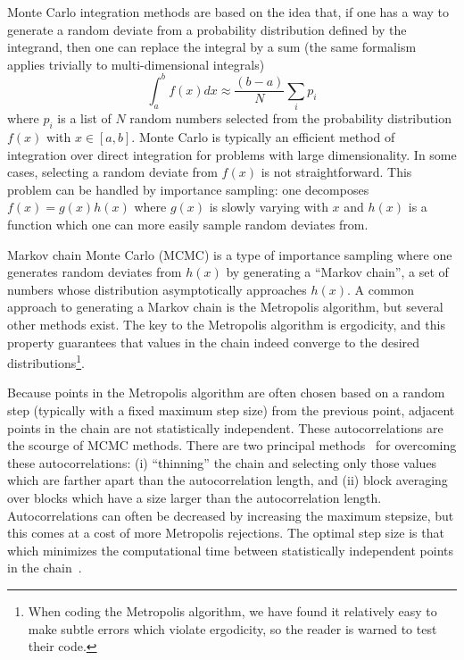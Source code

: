 Monte Carlo integration methods are based on the idea that, if one
has a way to generate a random deviate from a probability distribution
defined by the integrand, then one can replace the integral by a sum
(the same formalism applies trivially to multi-dimensional integrals)
\begin{equation}
  \int_a^{b} f(x) dx \approx \frac{\left( b-a\right)}{N} \sum_i p_i 
\end{equation}
where $p_i$ is a list of $N$ random numbers selected from the
probability distribution $f(x)$ with $x \in [a,b]$. Monte
Carlo is typically an efficient method of integration
over direct integration for
problems with large dimensionality. In some cases,
selecting a random deviate from $f(x)$ is not straightforward.
This problem can be handled by importance sampling: one decomposes
$f(x)=g(x)h(x)$ where $g(x)$ is slowly varying with $x$ and $h(x)$
is a function which one can more easily sample random deviates from.

Markov chain Monte Carlo (MCMC) is a type of
importance sampling where one generates random deviates from $h(x)$
by generating a ``Markov chain'', a set of numbers whose distribution
asymptotically approaches $h(x)$. A common approach to generating
a Markov chain is the Metropolis algorithm, but several other methods
exist. The key to the Metropolis algorithm is ergodicity, and this
property guarantees that values in the chain indeed converge to
the desired distributions\footnote{When coding the Metropolis algorithm, we
have found it relatively easy to make subtle errors which violate
ergodicity, so the reader is warned to test their code.}.

Because points in the Metropolis algorithm are often chosen based on a
random step (typically with a fixed maximum step size) from the
previous point, adjacent points in the chain are not statistically
independent. These autocorrelations are the scourge of MCMC methods.
There are two principal methods~\cite{Allen89} for overcoming these
autocorrelations: (i) ``thinning'' the chain and selecting only those
values which are farther apart than the autocorrelation length, and
(ii) block averaging over blocks which have a size larger than the
autocorrelation length. Autocorrelations can often be decreased
by increasing the maximum stepsize, but this comes at a cost of
more Metropolis rejections. The optimal step size is that which
minimizes the computational time between statistically independent
points in the chain~\cite{Sokal80}.

